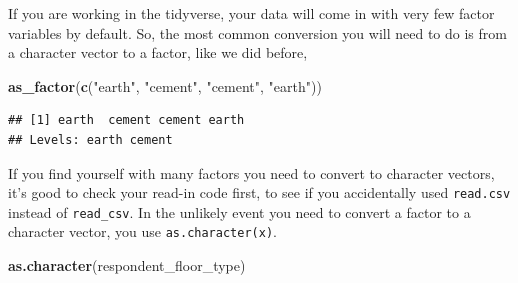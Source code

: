 \documentclass[]{book}
\newenvironment{Shaded}{\begin{snugshade}}{\end{snugshade}}
\newcommand{\KeywordTok}[1]{\textcolor[rgb]{0.13,0.29,0.53}{\textbf{#1}}}
\newcommand{\StringTok}[1]{\textcolor[rgb]{0.31,0.60,0.02}{#1}}
\newcommand{\NormalTok}[1]{#1}
\begin{document}
If you are working in the tidyverse, your data will come in with very
few factor variables by default. So, the most common conversion you will
need to do is from a character vector to a factor, like we did before,

\begin{Shaded}
\begin{Highlighting}[]
\KeywordTok{as_factor}\NormalTok{(}\KeywordTok{c}\NormalTok{(}\StringTok{"earth"}\NormalTok{, }\StringTok{"cement"}\NormalTok{, }\StringTok{"cement"}\NormalTok{, }\StringTok{"earth"}\NormalTok{))}
\end{Highlighting}
\end{Shaded}

\begin{verbatim}
## [1] earth  cement cement earth 
## Levels: earth cement
\end{verbatim}

If you find yourself with many factors you need to convert to character
vectors, it's good to check your read-in code first, to see if you
accidentally used \texttt{read.csv} instead of \texttt{read\_csv}. In
the unlikely event you need to convert a factor to a character vector,
you use \texttt{as.character(x)}.

\begin{Shaded}
\begin{Highlighting}[]
\KeywordTok{as.character}\NormalTok{(respondent_floor_type)}
\end{Highlighting}
\end{Shaded}
\end{document}
